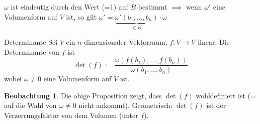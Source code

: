 \documentclass[oneside,fontsize=11pt,paper=a4,BCOR=0mm,DIV=12,automark,headsepline]{scrbook}
\theoremstyle{remark}
\theoremstyle{definition}
\newtheorem{beobachtung}{Beobachtung}
\theoremstyle{definition}
\theoremstyle{remark}
\begin{document}
\(\omega\) ist eindeutig durch den Wert (=1) auf \(B\) bestimmt \(\implies\)  wenn \(\omega'\) eine Volumenform auf \(V\) ist, so gilt \(\omega' = \underbrace{\omega'(b_1,\dots,b_n)}_{\in K}\cdot\omega\)

\begin{definition}{Determinante}{}
  Sei \(V\) ein \(n\)-dimensionaler Vektorraum, \(f: V\to V\) linear. Die Determinante von \(f\) ist
  \[\det(f):= \frac{\omega(f(b_1),\dots,f(b_n))}{\omega(b_1,\dots,b_n)}\]
  wobei \(\omega \neq 0\) eine Volumenform auf \(V\) ist.
\end{definition}

\begin{beobachtung}
  Die obige Proposition zeigt, dass \(\det(f)\) wohldefiniert ist (= auf die Wahl von \(\omega\neq 0\) nicht ankommt). Geometrisch: \(\det(f)\) ist der Verzerrungsfaktor von dem Volumen (unter \(f\)).
\end{beobachtung}
\end{document}
